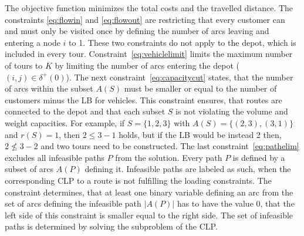 The objective function minimizes the total costs and the travelled distance. The constraints \ref{eq:flowin}
and \ref{eq:flowout} are restricting that every customer can and must only be visited once by defining the number
of arcs leaving and entering a node $i$ to 1. These two constraints do not apply to the depot,
which is included in every tour. Constraint~\ref{eq:vehiclelimit} limits the maximum number of
tours to $K$ by limiting the number of arcs entering the depot ($(i,j)\in \delta^+(0)$).
The next constraint~\ref{eq:capacitycut} states, that the number of arcs within the subset $A(S)$
must be smaller or equal to the number of customers minus the \gls{LB} for vehicles. This constraint
ensures, that routes are connected to the depot and that each subset $S$ is not violating
the volume and weight capacities. For example, if $S=\{1,2,3\}$ with $A(S)=\{(2,3),(3,1)\}$
and $r(S) = 1$, then $2 \leq 3 - 1$ holds, but if the \gls{LB} would be instead 2 then, $2 \not\leq 3 - 2$
and two tours need to be constructed. The last constraint~\ref{eq:pathelim} excludes all infeasible paths
$P$ from the solution. Every path $P$ is defined by a subset of arcs $A(P)$ defining it. Infeasible
paths are labeled as such, when the corresponding \gls{CLP} to a route is not fulfilling the loading
constraints. The constraint determines, that at least one binary variable defining an arc
from the set of arcs defining the infeasible path $|A(P)|$ has to have the value 0, that the left
side of this constraint is smaller equal to the right side. The set of infeasible paths is determined by
solving the subproblem of the \gls{CLP}.




